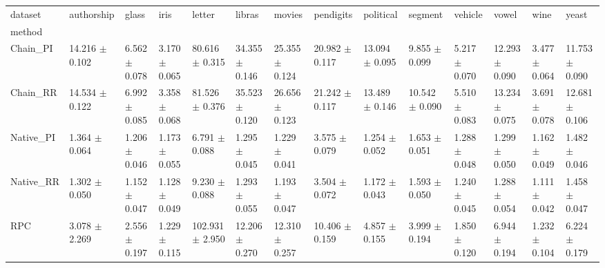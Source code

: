 \begin{tabular}{llllllllllllll}
\toprule
dataset &            authorship &                glass &                 iris &                 letter &                libras &                movies &             pendigits &             political &               segment &              vehicle &                 vowel &                 wine &                 yeast \\
method    &                       &                      &                      &                        &                       &                       &                       &                       &                       &                      &                       &                      &                       \\
\midrule
Chain_PI  &  14.216 $ \pm $ 0.102 &  6.562 $ \pm $ 0.078 &  3.170 $ \pm $ 0.065 &   80.616 $ \pm $ 0.315 &  34.355 $ \pm $ 0.146 &  25.355 $ \pm $ 0.124 &  20.982 $ \pm $ 0.117 &  13.094 $ \pm $ 0.095 &   9.855 $ \pm $ 0.099 &  5.217 $ \pm $ 0.070 &  12.293 $ \pm $ 0.090 &  3.477 $ \pm $ 0.064 &  11.753 $ \pm $ 0.090 \\
Chain_RR  &  14.534 $ \pm $ 0.122 &  6.992 $ \pm $ 0.085 &  3.358 $ \pm $ 0.068 &   81.526 $ \pm $ 0.376 &  35.523 $ \pm $ 0.120 &  26.656 $ \pm $ 0.123 &  21.242 $ \pm $ 0.117 &  13.489 $ \pm $ 0.146 &  10.542 $ \pm $ 0.090 &  5.510 $ \pm $ 0.083 &  13.234 $ \pm $ 0.075 &  3.691 $ \pm $ 0.078 &  12.681 $ \pm $ 0.106 \\
Native_PI &   1.364 $ \pm $ 0.064 &  1.206 $ \pm $ 0.046 &  1.173 $ \pm $ 0.055 &    6.791 $ \pm $ 0.088 &   1.295 $ \pm $ 0.045 &   1.229 $ \pm $ 0.041 &   3.575 $ \pm $ 0.079 &   1.254 $ \pm $ 0.052 &   1.653 $ \pm $ 0.051 &  1.288 $ \pm $ 0.048 &   1.299 $ \pm $ 0.050 &  1.162 $ \pm $ 0.049 &   1.482 $ \pm $ 0.046 \\
Native_RR &   1.302 $ \pm $ 0.050 &  1.152 $ \pm $ 0.047 &  1.128 $ \pm $ 0.049 &    9.230 $ \pm $ 0.088 &   1.293 $ \pm $ 0.055 &   1.193 $ \pm $ 0.047 &   3.504 $ \pm $ 0.072 &   1.172 $ \pm $ 0.043 &   1.593 $ \pm $ 0.050 &  1.240 $ \pm $ 0.045 &   1.288 $ \pm $ 0.054 &  1.111 $ \pm $ 0.042 &   1.458 $ \pm $ 0.047 \\
RPC       &   3.078 $ \pm $ 2.269 &  2.556 $ \pm $ 0.197 &  1.229 $ \pm $ 0.115 &  102.931 $ \pm $ 2.950 &  12.206 $ \pm $ 0.270 &  12.310 $ \pm $ 0.257 &  10.406 $ \pm $ 0.159 &   4.857 $ \pm $ 0.155 &   3.999 $ \pm $ 0.194 &  1.850 $ \pm $ 0.120 &   6.944 $ \pm $ 0.194 &  1.232 $ \pm $ 0.104 &   6.224 $ \pm $ 0.179 \\

\end{tabular}
